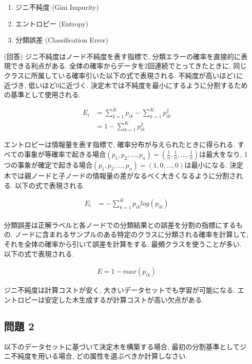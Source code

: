 \documentclass[dvipdfmx, 10pt]{jsarticle}
\begin{document}
\begin{enumerate}
    \item ジニ不純度 (Gini Impurity)
    \item エントロピー (Entropy)
    \item 分類誤差 (Classification Error)
\end{enumerate}

(回答)
ジニ不純度はノード不純度を表す指標で, 分類エラーの確率を直接的に表現できる利点がある.
全体の確率からデータを2回連続でとってきたときに, 同じクラスに所属している確率引いた以下の式で表現される. 
不純度が高いほど\(1\)に近づき, 低いほど\(0\)に近づく. 
決定木では不純度を最小にするように分割するための基準として使用される. 

\begin{align*}
    E_i 
    &= \sum_{k=1}^{K} p_{ik} - \sum_{k=1}^{K} p_{ik}^2 \\
    &= 1 - \sum_{k=1}^{K} p_{ik}^2
\end{align*}

エントロピーは情報量を表す指標で, 確率分布が与えられたときに得られる. 
すべての事象が等確率で起きる場合\((p_1, p_2, \dots, p_n) = (\frac{1}{n}, \frac{1}{n}, \dots, \frac{1}{n})\)は最大をなり, 
1つの事象が確定で起きる場合\((p_1, p_2, \dots, p_n) = (1, 0, \dots, 0)\)は最小になる. 
決定木では親ノードと子ノードの情報量の差がなるべく大きくなるように分割される. 
以下の式で表現される. 

\begin{align*}
    E_i
    &= -\sum_{k=1}^{K} p_{ik}log(p_{ik}) \\
\end{align*}

分類誤差は正解ラベルと各ノードでの分類結果との誤差を分割の指標にするもの. 
ノードに含まれるサンプルのある特定のクラスに分類される確率を計算して, それを全体の確率から引いて誤差を計算をする. 
最頻クラスを使うことが多い. 以下の式で表現される. 

\begin{align*}
    E = 1 - max(p_{ik})
\end{align*}

ジニ不純度は計算コストが安く, 大きいデータセットでも学習が可能になる. 
エントロピーは安定した木生成するが計算コストが高い欠点がある. 

\subsection*{問題 2}
以下のデータセットに基づいて決定木を構築する場合, 最初の分割基準としてジニ不純度を用いる場合, どの属性を選ぶべきか計算しなさい. 
\end{document}
